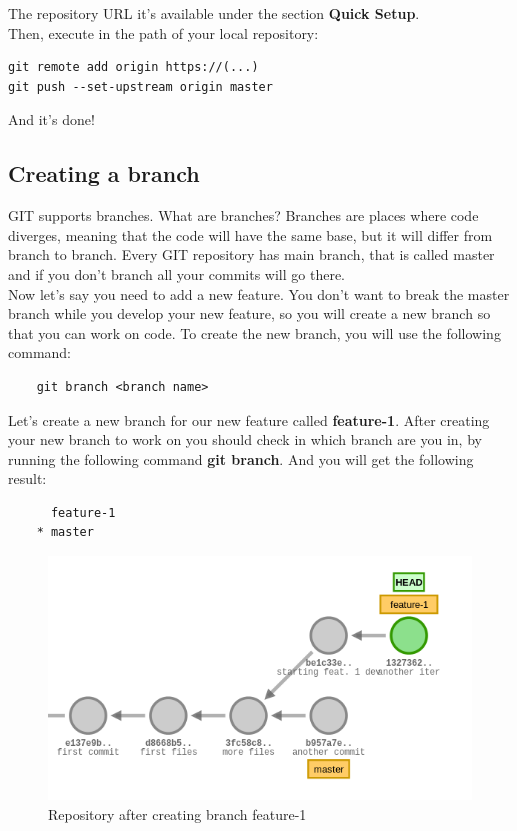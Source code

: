 \documentclass{article}
\begin{document}
The repository URL it's available under the section \textbf{Quick Setup}.\\

Then, execute in the path of your local repository:

\begin{lstlisting}
git remote add origin https://(...)
git push --set-upstream origin master
\end{lstlisting}

And it's done!

\subsection{Creating a branch}

GIT supports branches. What are branches? Branches are places where code diverges, meaning that the code will have the same base, but it will differ from branch to branch. Every GIT repository has main branch, that is called master and if you don't branch all your commits will go there.\\

Now let's say you need to add a new feature. You don't want to break the master branch while you develop your new feature, so you will create a new branch so that you can work on code. To create the new branch, you will use the following command:

\begin{lstlisting}
	git branch <branch name>
\end{lstlisting}

Let's create a new branch for our new feature called \textbf{feature-1}. After creating your new branch to work on you should check in which branch are you in, by running the following command \textbf{git branch}. And you will get the following result:

\begin{lstlisting}
	  feature-1
	* master
\end{lstlisting}

\begin{figure}[H]
\centerline{\includegraphics[scale=0.5]{repository_after_branch.png}}
\caption{Repository after creating branch feature-1}
\label{fig1}
\end{figure}
\end{document}
